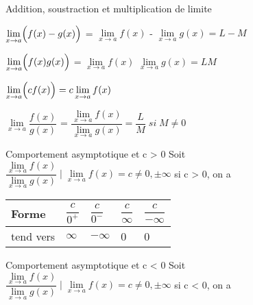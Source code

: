 \documentclass[2pt]{report}
\begin{document}
\begin{multicols*}{3}
\begin{Concept}{Addition, soustraction et multiplication de limite}{}
\begin{enumerate}
     $\lim\limits_{x\to a}\Bigl(f(x) - g(x) \Bigr) $ 
    =  $\lim\limits_{x\to a}f(x)$ -  $\lim\limits_{x\to a}g(x) = L - M$ 

     $\lim\limits_{x\to a}\Bigl(f(x)g(x) \Bigr) $ 
    =  $\lim\limits_{x\to a}f(x)$ $\lim\limits_{x\to a}g(x) = LM$

     $\lim\limits_{x\to a}\Bigl(c f(x)\Bigr) =  c\lim\limits_{x\to a}f(x)$ 

     $\lim\limits_{x\to a} \dfrac{f(x)}{g(x)} $ 
    =  $\dfrac{\lim\limits_{x\to a}f(x)}{\lim\limits_{x\to a}g(x)} = \dfrac{L}{M} \; si \; M \neq 0$

\end{enumerate}
\end{Concept}


\begin{Concept}{Comportement asymptotique et c > 0}{}
  Soit $\dfrac{\lim\limits_{x\to a}f(x)}{\lim\limits_{x\to a}g(x)} \; | \; 
  \lim\limits_{x\to a}f(x) = c \neq 0, \pm \infty$ si c > 0, on a 

\end{Concept}
  \begin{table}[h]
    \begin{center}
      \renewcommand{\arraystretch}{1.5}
      \selectfont
      \footnotesize
      \begin{tabular}{|l|l|l|l|l|}
      \arrayrulecolor{blue}\hline
      \rowcolor{lightBlue}
      \textcolor{myb}{Forme} & \textcolor{myb}{$\dfrac{c}{0^{+}}$} & \textcolor{myb}{$\dfrac{c}{0^{-}}$}
                             & \textcolor{myb}{$\dfrac{c}{\infty}$} & \textcolor{myb}{$\dfrac{c}{-\infty}$}
      \\
      \hline
      \hline
      \arrayrulecolor{black}
      tend vers & $\infty$ & $-\infty$ & 0 & 0 
      \\
      \hline
      

  \end{tabular}
  \end{center}
  \end{table}


\begin{Concept}{Comportement asymptotique et c < 0}{}
  Soit $\dfrac{\lim\limits_{x\to a}f(x)}{\lim\limits_{x\to a}g(x)} \; | \; 
  \lim\limits_{x\to a}f(x) = c \neq 0, \pm \infty$ si c < 0, on a 


\end{Concept}
\end{multicols*}
\end{document}
